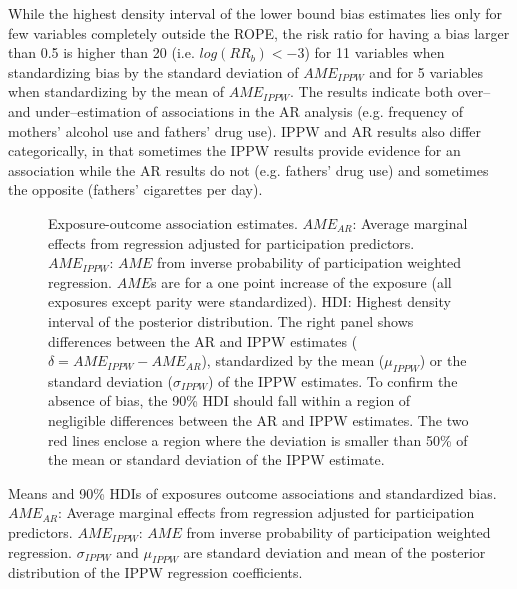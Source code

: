 \documentclass[12pt]{article}
\begin{document}
While the highest density interval of the lower bound bias estimates lies only for few variables completely outside the ROPE, the risk ratio for having a bias larger than 0.5 is higher than 20 (i.e. $log(RR_b) < -3$) for 11 variables when standardizing bias by the standard deviation of $AME_{IPPW}$ and for 5 variables when standardizing by the mean of $AME_{IPPW}$. The results indicate both over-- and under--estimation of associations in the AR analysis (e.g. frequency of mothers' alcohol use and fathers' drug use). IPPW and AR results also differ categorically, in that sometimes the IPPW results provide evidence for an association while the AR results do not (e.g. fathers' drug use) and sometimes the opposite (fathers' cigarettes per day). 

\begin{figure}
	\centering
	\caption{Exposure-outcome association estimates. $AME_{AR}$: Average marginal effects from regression adjusted for participation predictors. $AME_{IPPW}$: $AME$ from inverse probability of participation weighted regression. $AME$s are for a one point increase of the exposure (all exposures except parity were standardized). HDI: Highest density interval of the posterior distribution. The right panel shows differences between the AR and IPPW estimates ($\delta = AME_{IPPW}-AME_{AR}$), standardized by the mean ($\mu_{IPPW}$) or the standard deviation ($\sigma_{IPPW}$) of the IPPW estimates. To confirm the absence of bias, the 90\% HDI should fall within a region of negligible differences between the AR and IPPW estimates. The two red lines enclose a region where the deviation is smaller than 50\% of the mean or standard deviation of the IPPW estimate.}
	\label{fig:estimates}
\end{figure}


\begin{table}
	\caption{Means and 90\% HDIs of exposures outcome associations and standardized bias.
		$AME_{AR}$: Average marginal effects from regression adjusted for participation predictors. $AME_{IPPW}$: $AME$ from inverse probability of participation weighted regression. $\sigma_{IPPW}$ and $\mu_{IPPW}$ are standard deviation and mean of the posterior distribution of the IPPW regression coefficients.} 
	\label{table:estimates}
\end{table}
\end{document}
